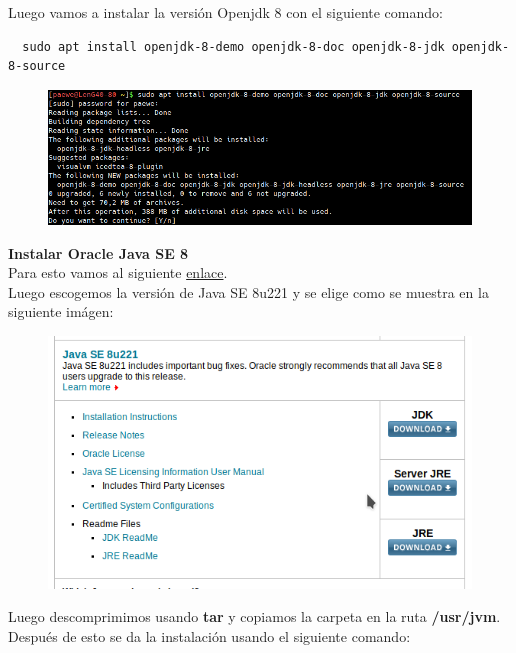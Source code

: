 \documentclass{article}
\begin{document}
Luego vamos a instalar la versión Openjdk 8 con el siguiente comando:

\begin{verbatim}
  sudo apt install openjdk-8-demo openjdk-8-doc openjdk-8-jdk openjdk-8-source
\end{verbatim}

\begin{figure}[h!]
    \centering
      \includegraphics[scale=0.75]{./Pictures/030_install_openjdk_ijidea.png}
\end{figure}

\newpage

\textbf{Instalar Oracle Java SE 8}\\
Para esto vamos al siguiente
\href{https://www.oracle.com/technetwork/java/javase/downloads/index.html}{enlace}.\\

Luego escogemos la versión de Java SE 8u221 y se elige como se muestra en la
siguiente imágen:\\

\begin{figure}[h!]
    \centering
      \includegraphics[scale=0.75]{./Pictures/001_javaSEOracle.png}
\end{figure}

Luego descomprimimos usando \textbf{tar} y copiamos la carpeta en la ruta
\textbf{/usr/jvm}. Después de esto se da la instalación usando el siguiente
comando:\\
\end{document}
